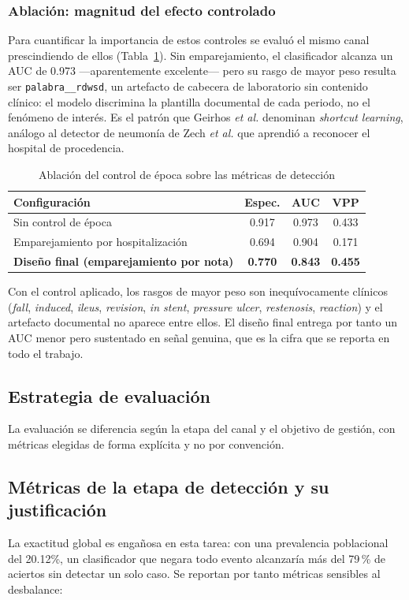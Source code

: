 \documentclass[conference]{IEEEtran}
\begin{document}
\subsubsection{Ablación: magnitud del efecto controlado}
Para cuantificar la importancia de estos controles se evaluó el mismo canal
prescindiendo de ellos (Tabla~\ref{tab:epoca}). Sin emparejamiento, el
clasificador alcanza un AUC de 0.973 ---aparentemente excelente--- pero su rasgo
de mayor peso resulta ser \texttt{palabra\_\_rdwsd}, un artefacto de cabecera de
laboratorio sin contenido clínico: el modelo discrimina la plantilla documental
de cada periodo, no el fenómeno de interés. Es el patrón que Geirhos
\emph{et al.} \cite{geirhos} denominan \emph{shortcut learning}, análogo al
detector de neumonía de Zech \emph{et al.} \cite{zech} que aprendió a
reconocer el hospital de procedencia.

\begin{table}[htbp]
\caption{Ablación del control de época sobre las métricas de detección}
\label{tab:epoca}
\centering
\footnotesize
\begin{tabular}{@{}lccc@{}}
\toprule
\textbf{Configuración} & \textbf{Espec.} & \textbf{AUC} & \textbf{VPP} \\
\midrule
Sin control de época & 0.917 & 0.973 & 0.433 \\
Emparejamiento por hospitalización & 0.694 & 0.904 & 0.171 \\
\textbf{Diseño final (emparejamiento por nota)} & \textbf{0.770} & \textbf{0.843} & \textbf{0.455} \\
\bottomrule
\end{tabular}
\end{table}

Con el control aplicado, los rasgos de mayor peso son inequívocamente clínicos
(\emph{fall}, \emph{induced}, \emph{ileus}, \emph{revision}, \emph{in stent}, \emph{pressure ulcer}, \emph{restenosis}, \emph{reaction}) y el artefacto documental no aparece entre ellos. El diseño
final entrega por tanto un AUC menor pero sustentado en señal genuina, que es
la cifra que se reporta en todo el trabajo.

\subsection{Estrategia de evaluación}
La evaluación se diferencia según la etapa del canal y el objetivo de gestión,
con métricas elegidas de forma explícita y no por convención.

\subsection{Métricas de la etapa de detección y su justificación}
La exactitud global es engañosa en esta tarea: con una prevalencia poblacional
del 20.12\%, un clasificador que negara todo evento
alcanzaría más del 79\,\% de aciertos sin detectar un solo caso. Se reportan por
tanto métricas sensibles al desbalance:
\end{document}
